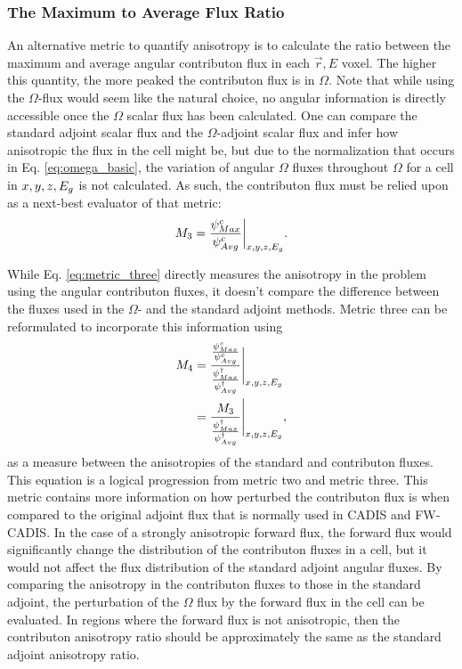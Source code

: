 \subsubsection{The Maximum to Average Flux Ratio}

An alternative metric to quantify anisotropy is to calculate the ratio between
the maximum and average angular contributon flux in each $\vec{r} , E$ voxel.
The higher this quantity, the more peaked the contributon flux is in $\Omega$.
Note that while using the $\Omega$-flux would seem like the natural choice,
no angular information is directly accessible once the $\Omega$ scalar flux has
been calculated. One can compare the standard adjoint scalar flux and the
$\Omega$-adjoint scalar flux and infer how anisotropic the flux in the cell might be, but
due to the normalization that occurs in Eq. \eqref{eq:omega_basic}, the
variation of angular $\Omega$ fluxes throughout $\Omega$ for a cell
in $x,y,z,E_g$ is not
calculated. As such, the contributon flux must be relied
upon as a next-best evaluator of that metric:
%
\begin{equation}
  M_{3} = \frac{\psi^{c}_{Max}}{\psi^{c}_{
          Avg}}\bigg\rvert_{x,y,z,E_g}  .
  \label{eq:metric_three}
\end{equation}

While Eq. \eqref{eq:metric_three} directly measures the anisotropy in the problem using
the angular contributon fluxes, it doesn't compare the difference
between the fluxes used
in the $\Omega$-  and the standard adjoint methods. Metric three
can be
reformulated to incorporate this information using
%
\begin{equation}
  \begin{split}
    M_{4} & = \frac{\frac{\psi^{c}_{Max}}{\psi^{c}_{
                  Avg}}}{\frac{\psi^{\dagger}_{
                  Max}}{\psi^{\dagger}_{Avg}}} \Bigg\rvert_{x,y,z,E_g} \\
          & = \frac{M_{3}}{\frac{\psi^{\dagger}_{Max}}
                  {\psi^{\dagger}_{Avg}}} \Bigg\rvert_{x,y,z,E_g},
  \end{split}
  \label{eq:metric_four}
\end{equation}
%
as a measure between the anisotropies of the standard and contributon fluxes.
This equation is a logical progression from metric two and
metric three. This metric contains more information on how perturbed the
contributon flux is when compared to the original adjoint flux that is normally
used in CADIS and FW-CADIS.
In the case of a strongly anisotropic
forward flux, the forward flux  would significantly
change the distribution of the contributon
fluxes in a cell, but it would not affect the flux distribution of the standard
adjoint angular fluxes. By comparing the anisotropy in the contributon
fluxes to those in the standard adjoint, the perturbation of the $\Omega$ flux by
the forward flux
in the cell can be evaluated. In regions where the forward flux is
not anisotropic, then the contributon anisotropy ratio should be approximately
the same as the standard adjoint anisotropy ratio.

